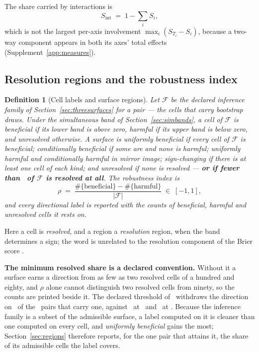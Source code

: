 \documentclass[11pt,3p,review,authoryear]{elsarticle}
\newtheorem{definition}{Definition}
\theoremstyle{definition}
\begin{document}
The share carried by interactions is
\begin{equation}
\label{eq:inttotal}
S_{\mathrm{int}} \;=\; 1 - \sum_i S_i ,
\end{equation}
which is not the largest per-axis involvement $\max_i (S_{T_i} - S_i)$,
because a two-way component appears in both its axes' total effects
(Supplement~\ref{app:measures}).

\subsection{Resolution regions and the robustness index}
\label{sec:regionsdef}

\begin{definition}[Cell labels and surface regions]
\label{def:regions}
Let $\mathcal{F}$ be the declared inference family of
Section~\ref{sec:threesurfaces} for a pair --- the cells that carry bootstrap
draws. Under the simultaneous band of Section~\ref{sec:simbands}, a
cell of
$\mathcal{F}$ is \emph{beneficial} if its lower band is above zero,
\emph{harmful} if its upper band is below zero, and \emph{unresolved}
otherwise. A surface is \emph{uniformly beneficial} if every cell of
$\mathcal{F}$ is beneficial; \emph{conditionally beneficial} if some are and
none is harmful;
\emph{uniformly harmful} and \emph{conditionally harmful} in mirror image;
\emph{sign-changing} if there is at least one cell of each kind; and
\emph{unresolved} if none is resolved --- \textbf{or if fewer than
\minResolvedSharePct\ of $\mathcal{F}$ is resolved at all}. The
\emph{robustness index} is
\[
\rho \;=\; \frac{\#\{\text{beneficial}\} - \#\{\text{harmful}\}}
{|\mathcal{F}|} \;\in\; [-1, 1],
\]
and every directional label is reported with the counts of beneficial,
harmful and unresolved cells it rests on.
\end{definition}

\noindent Here a cell is \emph{resolved}, and a region a \emph{resolution}
region, when the band determines a sign; the word is unrelated to the
resolution component of the Brier score \citep{murphy1973vector}.

\textbf{The minimum resolved share is a declared convention.}
Without it a surface earns a direction from as few as two resolved cells of a
hundred and eighty, and $\rho$ alone cannot distinguish two resolved cells
from ninety, so the counts are printed beside it. The declared threshold of
\minResolvedSharePct\ withdraws the direction on \nLabelsLostToMinShare\ of
the \nDirectionalLabels\ pairs that carry one, against \nLabelsLostMinOne\ at
\minShareLowPct\ and \nLabelsLostMinTen\ at \minShareHighPct. Because the
inference family is a subset of the admissible surface, a label computed on it
is cleaner than one computed on every cell, and \emph{uniformly beneficial}
gains the most; Section~\ref{sec:regions} therefore reports, for the one pair
that attains it, the share of its admissible cells the label covers.
\end{document}
